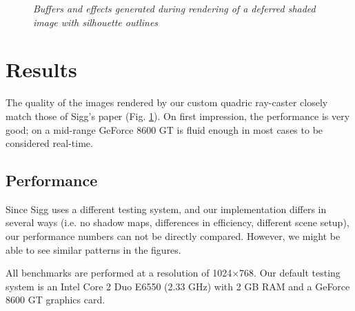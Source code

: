 \begin{figure}[!ht]
\caption{\em Buffers and effects generated during rendering of a deferred shaded image with silhouette outlines}
\label{f:steps}
\end{figure}

\section{Results}

The quality of the images rendered by our custom quadric ray-caster closely match those of Sigg's paper (Fig. \ref{f:steps}).
On first impression, the performance is very good; on a mid-range GeForce 8600 GT is fluid enough in most cases to be considered real-time.

\subsection*{Performance}
Since Sigg uses a different testing system, and our implementation differs in several ways (i.e. no shadow maps, differences in efficiency, different
scene setup), our performance numbers can not be directly compared. However, we might be able to see similar patterns in the figures.

All benchmarks are performed at a resolution of 1024$\times$768. 
Our default testing system is an Intel Core 2 Duo E6550 (2.33 GHz) with 2 GB RAM and a GeForce 8600 GT graphics card.

